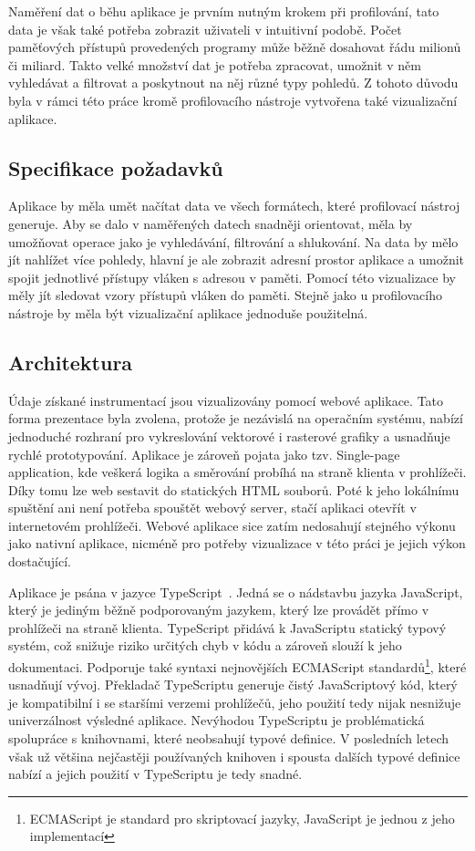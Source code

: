 Naměření dat o běhu aplikace je prvním nutným krokem při profilování, tato data je však také potřeba zobrazit uživateli v intuitivní podobě. Počet paměťových přístupů provedených programy může běžně dosahovat řádu milionů či miliard. Takto velké množství dat je potřeba zpracovat, umožnit v něm vyhledávat a filtrovat a poskytnout na něj různé typy pohledů. Z tohoto důvodu byla v rámci této práce kromě profilovacího nástroje vytvořena také vizualizační aplikace.

\subsection{Specifikace požadavků}
Aplikace by měla umět načítat data ve všech formátech, které profilovací nástroj generuje. Aby se dalo v naměřených datech snadněji orientovat, měla by umožňovat operace jako je vyhledávání, filtrování a shlukování. Na data by mělo jít nahlížet více pohledy, hlavní je ale zobrazit adresní prostor aplikace a umožnit spojit jednotlivé přístupy vláken s adresou v paměti. Pomocí této vizualizace by měly jít sledovat vzory přístupů vláken do paměti. Stejně jako u profilovacího nástroje by měla být vizualizační aplikace jednoduše použitelná.

\subsection{Architektura}
Údaje získané instrumentací jsou vizualizovány pomocí webové aplikace. Tato forma prezentace byla zvolena, protože je nezávislá na operačním systému, nabízí jednoduché rozhraní pro vykreslování vektorové i rasterové grafiky a usnadňuje rychlé prototypování. Aplikace je zároveň pojata jako tzv. Single-page application, kde veškerá logika a směrování probíhá na straně klienta v prohlížeči. Díky tomu lze web sestavit do statických HTML souborů. Poté k jeho lokálnímu spuštění ani není potřeba spouštět webový server, stačí aplikaci otevřít v internetovém prohlížeči. Webové aplikace sice zatím nedosahují stejného výkonu jako nativní aplikace, nicméně pro potřeby vizualizace v této práci je jejich výkon dostačující.

Aplikace je psána v jazyce TypeScript~\cite{typescript}. Jedná se o nádstavbu jazyka JavaScript, který je jediným běžně podporovaným jazykem, který lze provádět přímo v prohlížeči na straně klienta. TypeScript přidává k JavaScriptu statický typový systém, což snižuje riziko určitých chyb v kódu a zároveň slouží k jeho dokumentaci. Podporuje také syntaxi nejnovějších ECMAScript standardů\footnote{ECMAScript je standard pro skriptovací jazyky, JavaScript je jednou z jeho implementací}, které usnadňují vývoj. Překladač TypeScriptu generuje čistý JavaScriptový kód, který je kompatibilní i se staršími verzemi prohlížečů, jeho použití tedy nijak nesnižuje univerzálnost výsledné aplikace. Nevýhodou TypeScriptu je problématická spolupráce s knihovnami, které neobsahují typové definice. V posledních letech však už většina nejčastěji používaných knihoven i spousta dalších typové definice nabízí a jejich použití v TypeScriptu je tedy snadné.

